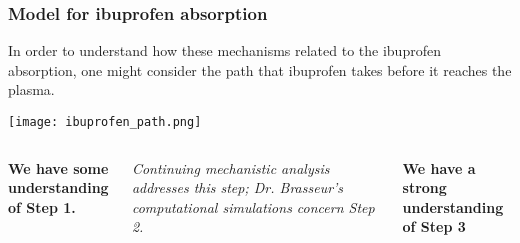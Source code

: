\documentclass[]{beamer}
\begin{document}
\begin{frame}\frametitle{Model for ibuprofen absorption}

	\small

	In order to understand how these mechanisms related to the ibuprofen absorption, one might consider the path that ibuprofen takes before it reaches the plasma.

	\texttt{[image: ibuprofen\_path.png]}

	\pause

	\footnotesize
	\begin{columns}[t]
		\begin{column}{.3\textwidth}
			{\bf We have some understanding of Step 1.}
		\end{column}
		\begin{column}{.3\textwidth}
			{\em Continuing mechanistic analysis addresses this step; Dr. Brasseur's computational simulations concern Step 2.}
		\end{column}
		\begin{column}{.3\textwidth}
			{\bf We have a strong understanding of Step 3}
		\end{column}
	\end{columns}

\end{frame}
\end{document}
